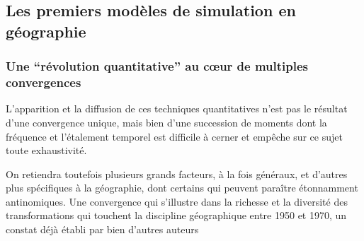 



\subsection{Les premiers modèles de simulation en géographie}
\label{sec:premier_modele_geo}

\subsubsection{Une \enquote{révolution quantitative} au cœur de multiples convergences}
\label{ssec:revol_quanti}

L'apparition et la diffusion de ces techniques quantitatives n'est pas le résultat d'une convergence unique, mais bien d'une succession de moments dont la fréquence et l'étalement temporel est difficile à cerner et empêche sur ce sujet toute exhaustivité. 

On retiendra toutefois plusieurs grands facteurs, à la fois généraux, et d'autres plus spécifiques à la géographie, dont certains qui peuvent paraître étonnamment antinomiques. Une convergence qui s'illustre dans la richesse et la diversité des transformations qui touchent la discipline géographique entre 1950 et 1970, un constat déjà établi par bien d'autres auteurs \autocite{Varenne2014}

